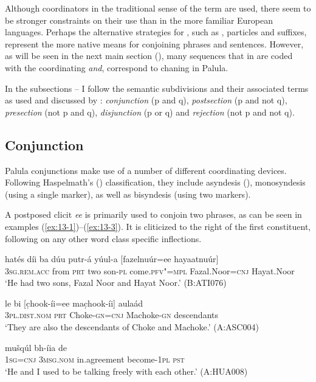 Although coordinators in the traditional sense of the term are used, there seem to be stronger constraints on their use than in the more familiar European languages. Perhaps the alternative strategies for , such as ,  particles and suffixes, represent the more native means for conjoining phrases and sentences. However, as will be seen in the next main section (), many sequences that in  are coded with the coordinating  \textit{and}, correspond to  chaning in Palula.



In the subsections -- I follow the semantic subdivisions and their associated terms as used and discussed by \citet{payne1985}: \textit{conjunction} (p and q), \textit{postsection} (p and not q), \textit{presection} (not p and q), \textit{disjunction} (p or q) and \textit{rejection} (not p and not q).


\subsection{Conjunction}
\label{subsec:13-2-1}

Palula conjunctions make use of a number of different coordinating devices. Following Haspelmath's (\citeyear{haspelmath2007}) classification, they include asyndesis (), monosyndesis (using a single marker), as well as bisyndesis (using two markers).

 A postposed  clicit \textit{ee} is primarily used to conjoin two  phrases, as can be seen in examples (\ref{ex:13-1})--(\ref{ex:13-3}). It is cliticized to the right of the first constituent, following on any other word class specific inflections.

\begin{exe}
\ex
\label{ex:13-1}
\gll hatés díi ba dúu putr-á yúul-a [fazelnuúr=ee hayaatnuúr] \\
\textsc{3sg.rem.acc} from \textsc{prt} two son-\textsc{pl} come.\textsc{pfv"=mpl} Fazal.Noor=\textsc{cnj} Hayat.Noor\\
\glt `He had two sons, Fazal Noor and Hayat Noor.' (B:ATI076) 

\ex
\label{ex:13-2}
\gll le bi [c̣hook-íi=ee mac̣hook-íi] aulaád \\
\textsc{3pl.dist.nom} \textsc{prt} Choke-\textsc{gn=cnj} Machoke-\textsc{gn} descendants\\
\glt `They are also the descendants of Choke and Machoke.' (A:ASC004)

\ex
\label{ex:13-3}
\gll [máa=ee so] mušqúl bh-íia de  \\
\textsc{1sg}=\textsc{cnj} \textsc{3msg.nom} in.agreement become-\textsc{1pl} \textsc{pst} \\
\glt `He and I used to be talking freely with each other.' (A:HUA008) 
\end{exe}


